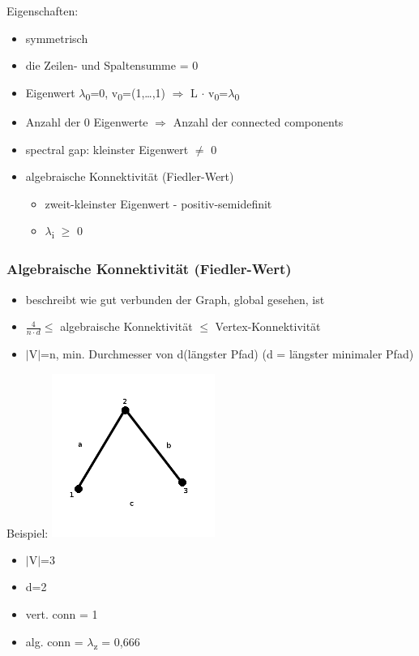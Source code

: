 Eigenschaften:
\begin{itemize}
	\item symmetrisch
	\item die Zeilen- und Spaltensumme = 0
	\item Eigenwert $\lambda$\textsubscript{0}=0, v\textsubscript{0}=(1,\ldots,1) $\Rightarrow$ L $\cdot$ v\textsubscript{0}=$\lambda$\textsubscript{0}
	\item Anzahl der 0 Eigenwerte $\Rightarrow$ Anzahl der connected components
	\item spectral gap: kleinster Eigenwert $\neq$ 0
	\item algebraische Konnektivität (Fiedler-Wert)
	\begin{itemize}
		\item zweit-kleinster Eigenwert - positiv-semidefinit
		\item $\lambda$\textsubscript{i} $\geq$ 0
	\end{itemize}
\end{itemize}

\subsubsection{Algebraische Konnektivität (Fiedler-Wert)}
\begin{itemize}
	\item beschreibt wie gut verbunden der Graph, global gesehen, ist
	\item $\frac{4}{n \cdot d} \leq$ algebraische Konnektivität $\leq$ Vertex-Konnektivität
	\item $|$V$|$=n, min. Durchmesser von d(längster Pfad) (d = längster minimaler Pfad)
\end{itemize}

Beispiel:
\includegraphics[width=0.4\textwidth]{lectures/161028/pix/dreieck.png}\newline
\begin{itemize}
	\item $\mid$V$\mid$=3
	\item d=2
	\item vert. conn = 1
	\item alg. conn = $\lambda$\textsubscript{z} = 0,666 
\end{itemize}

